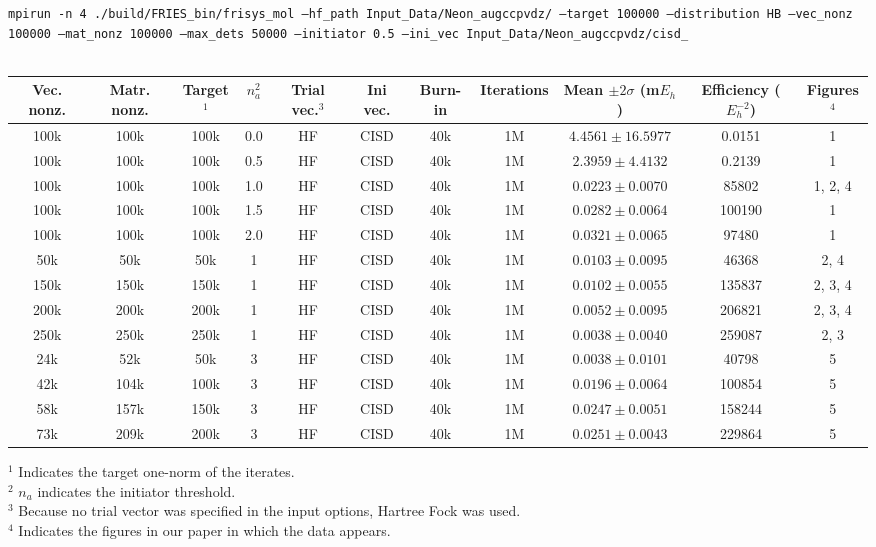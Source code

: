 \documentclass[12pt, landscape]{article}
\begin{document}
\texttt{mpirun -n 4 ./build/FRIES\_bin/frisys\_mol --hf\_path Input\_Data/Neon\_augccpvdz/ --target 100000 --distribution HB --vec\_nonz 100000 --mat\_nonz 100000 --max\_dets 50000 --initiator 0.5 --ini\_vec Input\_Data/Neon\_augccpvdz/cisd\_}
\\~\\
\begin{tabular}{c|c|c|c|c|c|c|c|c|c|c}
Vec. nonz. & Matr. nonz. & Target$^1$ & $n_a^2$ & Trial vec.$^3$ & Ini vec. & Burn-in & Iterations & Mean $\pm 2 \sigma$ (m$E_h$) & Efficiency ($E_h^{-2}$) & Figures$^4$ \\ \hline
100k & 100k & 100k & 0.0 & HF & CISD & 40k & 1M & $4.4561 \pm 16.5977$ & 0.0151 & 1 \\
100k & 100k & 100k & 0.5 & HF & CISD  & 40k & 1M & $2.3959 \pm 4.4132$ & 0.2139 & 1 \\
100k & 100k & 100k & 1.0 & HF & CISD  & 40k & 1M & $0.0223 \pm 0.0070$ & 85802 & 1, 2, 4 \\
100k & 100k & 100k & 1.5 & HF & CISD  & 40k & 1M & $0.0282 \pm 0.0064$ & 100190 & 1 \\
100k & 100k & 100k & 2.0 & HF & CISD  & 40k & 1M & $0.0321 \pm 0.0065$ & 97480 & 1 \\
50k & 50k & 50k & 1 & HF & CISD &  40k & 1M & $0.0103 \pm 0.0095$ & 46368 & 2, 4 \\
150k & 150k & 150k & 1 & HF & CISD &  40k & 1M & $0.0102 \pm 0.0055$ & 135837 & 2, 3, 4 \\
200k & 200k & 200k & 1 & HF & CISD &  40k & 1M & $0.0052 \pm 0.0095$ & 206821 & 2, 3, 4 \\
250k & 250k & 250k & 1 & HF & CISD &  40k & 1M & $0.0038 \pm 0.0040$ & 259087 & 2, 3 \\
24k & 52k & 50k & 3 & HF & CISD & 40k & 1M & $0.0038 \pm 0.0101$ & 40798 & 5 \\
42k & 104k & 100k &  3 & HF & CISD & 40k & 1M & $ 0.0196 \pm 0.0064$ & 100854 & 5 \\
58k & 157k & 150k & 3 & HF & CISD & 40k & 1M & $0.0247 \pm 0.0051$ & 158244 & 5 \\
73k & 209k & 200k & 3 & HF & CISD & 40k & 1M & $0.0251 \pm 0.0043$ & 229864 & 5 \\
\end{tabular}
$^1$ Indicates the target one-norm of the iterates. \\
$^2$ $n_a$ indicates the initiator threshold. \\
$^3$ Because no trial vector was specified in the input options, Hartree Fock was used.\\
$^4$ Indicates the figures in our paper in which the data appears.
\end{document}
